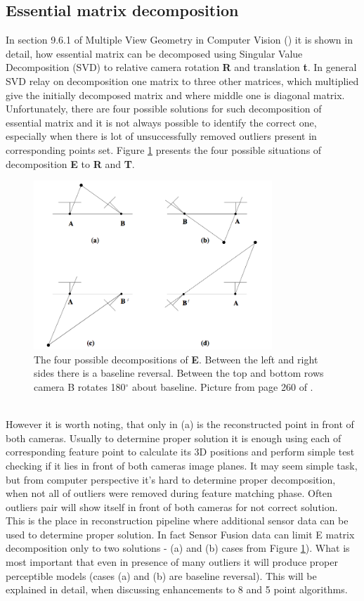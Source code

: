 \subsection{Essential matrix decomposition}
In section 9.6.1 of Multiple View Geometry in Computer Vision (\cite{HartleyMultipleView}) it is shown in detail, how essential matrix can be decomposed using Singular Value Decomposition (SVD) to relative camera rotation \textbf{R} and translation \textbf{t}. In general SVD relay on decomposition one matrix to three other matrices, which multiplied give the initially decomposed matrix and where middle one is diagonal matrix. \\ 
Unfortunately, there are four possible solutions for such decomposition of essential matrix and it is not always possible to identify the correct one, especially when there is lot of unsuccessfully removed outliers present in corresponding points set. Figure \ref{fig:fourAmbig} presents the four possible situations of decomposition \textbf{E} to \textbf{R} and \textbf{T}. 
\begin{figure}[h!]
    \centering
    \includegraphics[width=0.8\textwidth]{fourAmbig}
    \caption[The four possible decompositions of \textbf{E}]{The four possible decompositions of \textbf{E}. Between the left and right sides there is a baseline reversal. Between the top and bottom rows camera B rotates 180$^{\circ}$ about baseline. Picture from page 260 of \cite{HartleyMultipleView}.}
    \label{fig:fourAmbig}
\end{figure}
\\
However it is worth noting, that only in (a) is the reconstructed point in front of both cameras. Usually to determine proper solution it is enough using each of corresponding feature point to calculate its 3D positions and perform simple test checking if it lies in front of both cameras image planes. It may seem simple task, but from computer perspective it's hard to determine proper decomposition, when not all of outliers were removed during feature matching phase. Often outliers pair will show itself in front of both cameras for not correct solution.
This is the place in reconstruction pipeline where additional sensor data can be used to determine proper solution. In fact Sensor Fusion data can limit E matrix decomposition only to two solutions - (a) and (b) cases from Figure \ref{fig:fourAmbig}). What is most important that even in presence of many outliers it will produce proper perceptible models (cases (a) and (b) are baseline reversal). This will be explained in detail, when discussing enhancements to 8 and 5 point algorithms.
